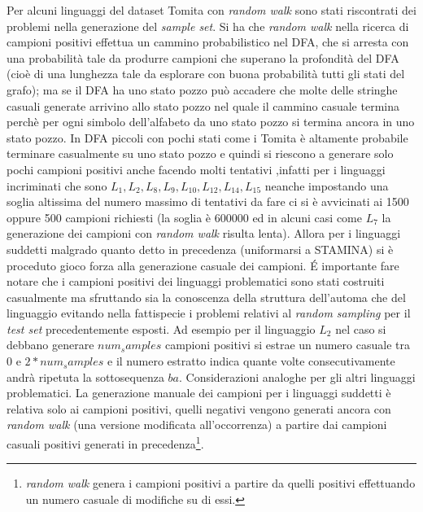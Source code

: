  Per alcuni linguaggi del dataset Tomita con \textit{random walk} sono stati riscontrati dei problemi nella generazione del \textit{sample set}. Si ha che \textit{random walk} nella ricerca di campioni positivi effettua un cammino probabilistico nel \ac{DFA}, che si arresta con una probabilità tale da produrre campioni che superano la profondità del \ac{DFA} (cioè di una lunghezza tale da esplorare con buona probabilità tutti gli stati del grafo); ma se il \ac{DFA} ha uno stato pozzo può accadere che molte delle stringhe casuali generate arrivino allo stato pozzo nel quale il cammino casuale termina perchè per ogni simbolo dell'alfabeto da uno stato pozzo si termina ancora in uno stato pozzo. In \ac{DFA} piccoli con pochi stati come i Tomita è altamente probabile terminare casualmente su uno stato pozzo e quindi si riescono a  generare solo pochi campioni positivi anche facendo molti tentativi ,infatti per i linguaggi incriminati che sono $L_1,L_2,L_8,L_9,L_{10},L_{12},L_{14},L_{15}$ neanche impostando una soglia altissima del numero massimo di tentativi  da fare  ci si è avvicinati ai 1500 oppure 500 campioni richiesti (la soglia è 600000 ed in alcuni casi come $L_7$ la generazione dei campioni con \textit{random walk} risulta lenta). Allora per i linguaggi suddetti malgrado quanto detto in precedenza (uniformarsi a STAMINA) si è proceduto gioco forza alla generazione casuale dei campioni. \'E importante fare notare che  i campioni positivi dei linguaggi problematici sono stati costruiti casualmente ma sfruttando sia la conoscenza della struttura dell'automa che del linguaggio evitando nella fattispecie i problemi relativi al  \textit{random sampling} per il \textit{test set} precedentemente esposti.  Ad esempio per il linguaggio $L_2$ nel caso si debbano generare $num_samples$ campioni positivi si estrae un numero casuale tra $0$ e $2*num_samples$ e il numero estratto indica quante volte consecutivamente andrà ripetuta la sottosequenza  $ba$. Considerazioni analoghe per gli altri linguaggi problematici. La generazione manuale dei campioni per i linguaggi suddetti è relativa solo ai campioni positivi, quelli negativi vengono generati ancora con \textit{random walk} (una versione modificata all'occorrenza) a partire dai campioni casuali positivi generati in precedenza\footnote{\textit{random walk} genera i campioni positivi a partire da quelli positivi effettuando un numero casuale di modifiche su di essi.}.
 
